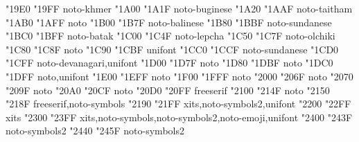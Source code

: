 \documentclass{article}
\begin{document}
                                  {  "19E0} {  "19FF} {noto-khmer}
                                       {  "1A00} {  "1A1F} {noto-buginese}
                                       {  "1A20} {  "1AAF} {noto-taitham}
           {  "1AB0} {  "1AFF} {noto}
                                       {  "1B00} {  "1B7F} {noto-balinese}
                                      {  "1B80} {  "1BBF} {noto-sundanese}
                                          {  "1BC0} {  "1BFF} {noto-batak}
                                         {  "1C00} {  "1C4F} {noto-lepcha}
                                       {  "1C50} {  "1C7F} {noto-olchiki}
                            {  "1C80} {  "1C8F} {noto}
                              {  "1C90} {  "1CBF} {unifont}
                           {  "1CC0} {  "1CCF} {noto-sundanese}
                               {  "1CD0} {  "1CFF} {noto-devanagari,unifont}
                            {  "1D00} {  "1D7F} {noto}
                 {  "1D80} {  "1DBF} {noto}
         {  "1DC0} {  "1DFF} {noto,unifont}
                      {  "1E00} {  "1EFF} {noto}
                                 {  "1F00} {  "1FFF} {noto}
                            {  "2000} {  "206F} {noto}
                    {  "2070} {  "209F} {noto}
                               {  "20A0} {  "20CF} {noto}
        {  "20D0} {  "20FF} {freeserif}
                             {  "2100} {  "214F} {noto}
                                   {  "2150} {  "218F} {freeserif,noto-symbols}
                                         {  "2190} {  "21FF} {xits,noto-symbols2,unifont}
                         {  "2200} {  "22FF} {xits}
                        {  "2300} {  "23FF} {xits,noto-symbols,noto-symbols2,noto-emoji,unifont}
                               {  "2400} {  "243F} {noto-symbols2}
                  {  "2440} {  "245F} {noto-symbols2}
\end{document}
